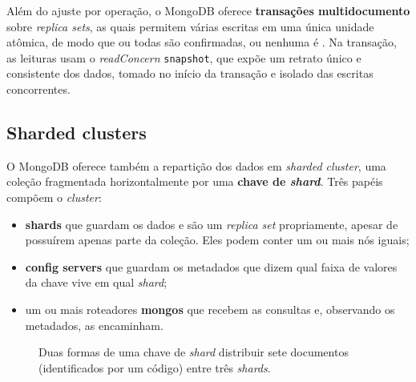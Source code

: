 Além do ajuste por operação, o MongoDB oferece \textbf{transações multidocumento} sobre \textit{replica sets}, as quais permitem várias escritas em uma única unidade atômica, de modo que ou todas são confirmadas, ou nenhuma é \citep{schultz2025}. Na transação, as leituras usam o \textit{readConcern} \texttt{snapshot}, que expõe um retrato único e consistente dos dados, tomado no início da transação e isolado das escritas concorrentes.

\subsection{Sharded clusters}
\label{sub:sharded-clusters}

O MongoDB oferece também a repartição dos dados em \textit{sharded cluster}, uma coleção fragmentada horizontalmente por uma \textbf{chave de \textit{shard}}. Três papéis compõem o \textit{cluster}:

\begin{itemize}
  \item \textbf{shards} que guardam os dados e são um \textit{replica set} propriamente, apesar de possuírem apenas parte da coleção. Eles podem conter um ou mais nós iguais;
  \item \textbf{config servers} que guardam os metadados que dizem qual faixa de valores da chave vive em qual \textit{shard};
  \item um ou mais roteadores \textbf{mongos} que recebem as consultas e, observando os metadados, as encaminham.
\end{itemize}

\begin{figure}[htb]
  \centering
  \caption{Duas formas de uma chave de \textit{shard} distribuir sete documentos (identificados por um código) entre três \textit{shards}.}
  \label{fig:shard-key}
\end{figure}

